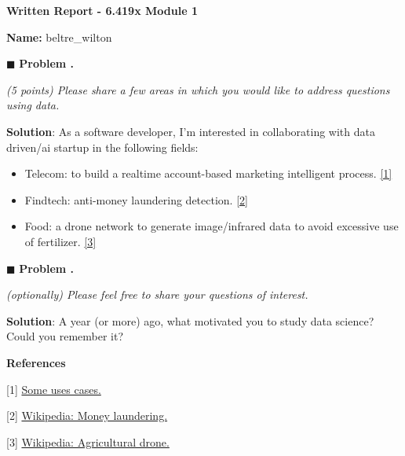 \documentclass[11pt]{amsart}
\newcounter{prob}
\newcounter{module}
\newcommand{\prob}{
    \stepcounter{prob}
    \begin{flushleft}
        $\blacksquare$\;\; \textbf{Problem \themodule.\theprob}
    \end{flushleft}}
\newcommand{\sol}[1]{
    \begin{flushleft}
        \justifying
        \textbf{Solution}: #1
    \end{flushleft}
    \vspace{5pt}}
\newcommand{\maketitleNew}[1][]{
        \setcounter{module}{#1}
        \begin{center}
            \Large{\textbf{Written Report - 6.419x Module #1}}
            \vspace{5pt}
            \end{center}
        \begin{flushright}
            \textbf{Name:} \normalsize{beltre\_wilton  %
            }
        \end{flushright}}
\begin{document}
\maketitleNew[1] %

\prob
\textit{(5 points) Please share a few areas in which you would like to address questions using data.}
\sol{
 As a software developer, I'm interested in collaborating with data driven/ai startup in the following fields:
\begin{itemize}
  \item Telecom: to build a realtime account-based marketing intelligent process. \hyperlink{1}{[1]} 
  \item Findtech: anti-money laundering detection. \hyperlink{2}{[2]}
  \item Food: a drone network to generate image/infrared data to avoid excessive use of fertilizer. \hyperlink{3}{[3]}
\end{itemize}
}
\prob
\textit{(optionally) Please feel free to share your questions of interest.}
\sol{A year (or more) ago, what motivated you to study data science? Could you remember it?}


\vfill
\centerline{{\bfseries References}}

\hypertarget{1}{[1] \href{https://www.ttec.com/articles/real-time-marketing-analytics-customer-data-optimization-best-practices}{Some uses cases.}}

\hypertarget{2}{[2] \href{https://en.wikipedia.org/wiki/Money_laundering}{Wikipedia: Money laundering.}}

\hypertarget{3}{[3] \href{https://en.wikipedia.org/wiki/Agricultural_drone}{Wikipedia: Agricultural drone.}}


\newpage


\end{document}
